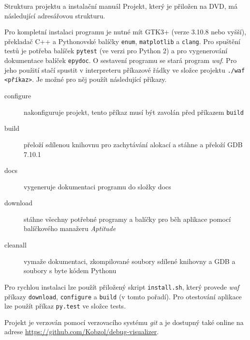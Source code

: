 \documentclass[bc,male,python,dept460]{diploma}						%
\newcommand{\parspace}[1][]{
	\ifthenelse{\isempty{#1}}{\vspace{5mm}}{\vspace{#1}}
	\par
}
\begin{document}
\appendix
\begin{section}{Struktura projektu a instalační manuál}
\label{appendix:manual}
	Projekt, který je přiložen na DVD, má následující adresářovou strukturu.
	
	\vspace{5mm}
	
	
	\parspace Pro kompletní instalaci programu je nutné mít GTK3+ (verze 3.10.8 nebo vyšší), překladač C++ a Pythonovské balíčky \texttt{enum},
	\texttt{matplotlib} a \texttt{clang}. Pro spuštění testů je potřeba balíček \texttt{pytest} (ve verzi pro Python 2) a
	pro vygenerování dokumentace balíček \texttt{epydoc}. O sestavení programu se stará program \textit{waf}. Pro jeho použití stačí spustit v interpreteru
	příkazové řádky ve složce projektu \texttt{./waf <příkaz>}. Je možné pro něj použít následující příkazy.
	
	\begin{description}
		\item[configure] nakonfiguruje projekt, tento příkaz musí být zavolán před příkazem \texttt{build}
		\item[build] přeloží sdílenou knihovnu pro zachytávání alokací a stáhne a přeloží GDB 7.10.1
		\item[docs] vygeneruje dokumentaci programu do složky docs
		\item[download] stáhne všechny potřebné programy a balíčky pro běh aplikace pomocí balíčkového manažeru \textit{Aptitude}
		\item[cleanall] vymaže dokumentaci, zkompilované soubory sdílené knihovny a GDB a soubory s byte kódem Pythonu
	\end{description}
	
	\parspace Pro rychlou instalaci lze použít přiložený skript \texttt{install.sh}, který provede \textit{waf} příkazy \texttt{download}, \texttt{configure}
	a \texttt{build} (v tomto pořadí).
	Pro otestování aplikace lze použít příkaz \texttt{py.test} ve složce tests.
	
	\vspace{5mm}
	
	Projekt je verzován pomocí verzovacího systému \textit{git} a je dostupný také online na adrese \url{https://github.com/Kobzol/debug-visualizer}.
\end{section}
\end{document}
